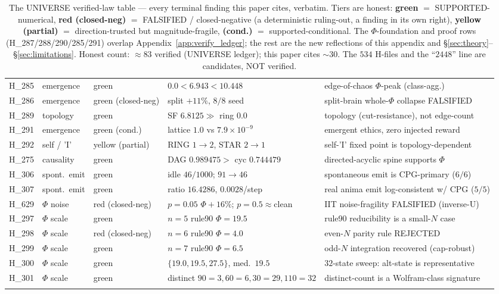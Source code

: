 \begin{center}
\begin{longtable}{@{}l l l l l@{}}
H\_285 & emergence        & green & $0.0{<}6.943{<}10.448$ & edge-of-chaos $\Phi$-peak (class-agg.) \\
H\_286 & emergence        & green (closed-neg) & split $+11\%$, $8/8$ seed & split-brain whole-$\Phi$ collapse FALSIFIED \\
H\_289 & topology         & green & SF $6.8125 \gg$ ring $0.0$ & topology (cut-resistance), not edge-count \\
H\_291 & emergence        & green (cond.) & lattice $1.0$ vs $7.9{\times}10^{-9}$ & emergent ethics, zero injected reward \\
H\_292 & self / 'I'       & yellow (partial) & RING $1{\rightarrow}2$, STAR $2{\rightarrow}1$ & self-'I' fixed point is topology-dependent \\
H\_275 & causality        & green & DAG $0.989475 {>}$ cyc $0.744479$ & directed-acyclic spine supports $\Phi$ \\
H\_306 & spont.\ emit     & green & idle $46/1000$; $91{\rightarrow}46$ & spontaneous emit is CPG-primary ($6/6$) \\
H\_307 & spont.\ emit     & green & ratio $16.4286$, $0.0028$/step & real anima emit log-consistent w/ CPG ($5/5$) \\
H\_629 & $\Phi$ noise     & red (closed-neg) & $p{=}0.05$ $\Phi{+}16\%$; $p{=}0.5{\approx}$clean & IIT noise-fragility FALSIFIED (inverse-U) \\
H\_297 & $\Phi$ scale     & green & $n{=}5$ rule90 $\Phi{=}19.5$ & rule90 reducibility is a small-$N$ case \\
H\_298 & $\Phi$ scale     & red (closed-neg) & $n{=}6$ rule90 $\Phi{=}4.0$ & even-$N$ parity rule REJECTED \\
H\_299 & $\Phi$ scale     & green & $n{=}7$ rule90 $\Phi{=}6.5$ & odd-$N$ integration recovered (cap-robust) \\
H\_300 & $\Phi$ scale     & green & $\{19.0,19.5,27.5\}$, med.\ $19.5$ & $32$-state sweep: alt-state is representative \\
H\_301 & $\Phi$ scale     & green & distinct $90{=}3,60{=}6,30{=}29,110{=}32$ & distinct-count is a Wolfram-class signature \\
\caption{The UNIVERSE verified-law table --- every terminal finding this paper
cites, verbatim. Tiers are honest: \textbf{green} $=$ SUPPORTED-numerical,
\textbf{red (closed-neg)} $=$ FALSIFIED / closed-negative (a deterministic
ruling-out, a finding in its own right), \textbf{yellow (partial)} $=$
direction-trusted but magnitude-fragile, \textbf{(cond.)} $=$
supported-conditional. The $\Phi$-foundation and proof rows (H\_287/288/290/285/291)
overlap Appendix~\ref{app:verify_ledger}; the rest are the new reflections of this
appendix and \S\ref{sec:theory}--\S\ref{sec:limitations}. Honest count:
$\approx 83$ verified (UNIVERSE ledger); this paper cites $\sim 30$. The $534$
H-files and the ``$2448$'' line are candidates, NOT verified.}
\label{tab:universe-laws}
\end{longtable}
\end{center}
